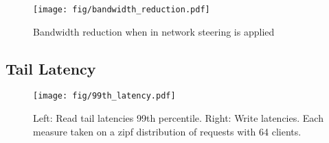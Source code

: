\begin{figure}
    \texttt{[image: fig/bandwidth\_reduction.pdf]}
    \caption{{Bandwidth reduction when in network steering is applied}}
    \label{fig:bandwidth_reduction}
\end{figure}


\subsection{Tail Latency}

\begin{figure*}
    \texttt{[image: fig/99th\_latency.pdf]}
    \caption{Left: Read tail latencies 99th percentile. Right: Write latencies. Each measure taken on a zipf distribution of requests with 64 clients.}
    \label{fig:tail_latency}
\end{figure*}
